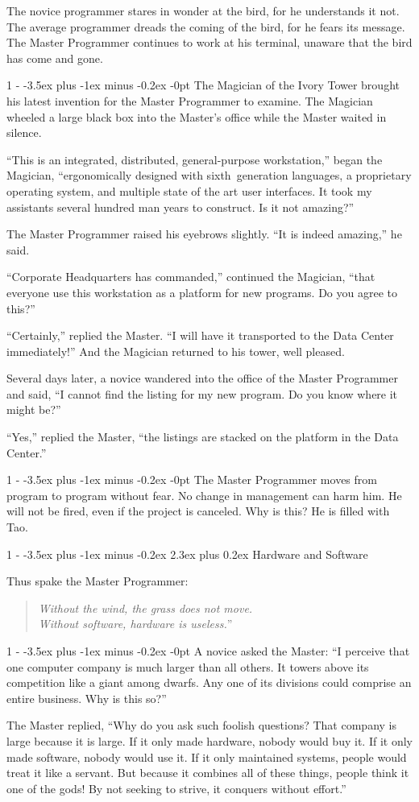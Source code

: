 \documentclass[12pt,letterpaper,titlepage]{article}
\makeatletter
\newlength{\intomargin}\setlength{\intomargin}{25pt}
\renewcommand{\section}{%
\@startsection{section}%
{1}%
{-\intomargin}%
{-3.5ex plus -1ex minus -0.2ex}%
{2.3ex plus 0.2ex}%
{\clearpage\normalfont\Large\bfseries}%
}
\renewcommand{\subsection}{%
\@startsection{subsection}%
{1}%
{-\intomargin}%
{-3.5ex plus -1ex minus -0.2ex}%
{-0pt}%
{\normalfont\normalsize\bfseries}%
}
\newcommand{\book}[2]{\section{#1}\par\hspace{-\intomargin}Thus spake the Master Programmer:%
\begin{quotation}\noindent\llap{``}\textsl{#2}''\end{quotation}\medskip}
\newcommand{\sect}{\subsection{}}
\makeatother
\begin{document}
The novice programmer stares in wonder at the bird, for he understands
it not. The average programmer dreads the coming of the bird, for he
fears its message. The Master Programmer continues to work at his
terminal, unaware that the bird has come and gone.

\sect
The Magician of the Ivory Tower brought his latest invention for the
Master Programmer to examine. The Magician wheeled a large black box
into the Master's office while the Master waited in silence.

``This is an integrated, distributed, general-purpose workstation,''
began the Magician, ``ergonomically designed with sixth~generation languages, a proprietary operating
system, and multiple state of the art user interfaces. It took my assistants several hundred man
years to construct. Is it not amazing?''

The Master Programmer raised his eyebrows slightly. ``It is indeed
amazing,'' he said.

``Corporate Headquarters has commanded,'' continued the Magician,
``that everyone use this workstation as a platform for new
programs. Do you agree to this?''

``Certainly,'' replied the Master. ``I will have it transported to the
Data Center immediately!'' And the Magician returned to his tower,
well pleased.

Several days later, a novice wandered into the office of the Master
Programmer and said, ``I cannot find the listing for my new
program. Do you know where it might be?''

``Yes,'' replied the Master, ``the listings are stacked on the
platform in the Data Center.''

\sect
The Master Programmer moves from program to program without fear. No
change in management can harm him. He will not be fired, even if the
project is canceled. Why is this? He is filled with Tao.

\book{Hardware and Software}%
{Without the wind, the grass does not move.\\ Without software,
hardware is useless.}

\sect
A novice asked the Master: ``I perceive that one computer company is
much larger than all others. It towers above its competition like a
giant among dwarfs. Any one of its divisions could comprise an entire
business. Why is this so?''

The Master replied, ``Why do you ask such foolish questions? That
company is large because it is large. If it only made hardware, nobody
would buy it. If it only made software, nobody would use it. If it
only maintained systems, people would treat it like a servant. But
because it combines all of these things, people think it one of the
gods! By not seeking to strive, it conquers without effort.''
\end{document}
